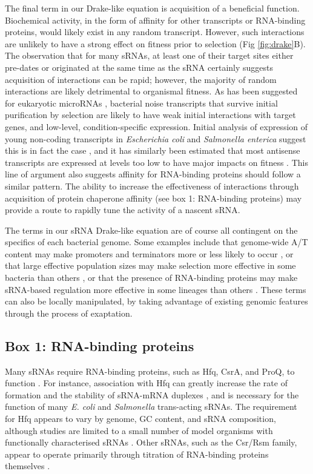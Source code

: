 The final term in our Drake-like equation is acquisition of a beneficial function. Biochemical activity, in the form of affinity for other transcripts or RNA-binding proteins, would likely exist in any random transcript. However, such interactions are unlikely to have a strong effect on fitness prior to selection (Fig \ref{fig:drake}B). The observation that for many sRNAs, at least one of their target sites either pre-dates or originated at the same time as the sRNA \citep{Peer2014-yn} certainly suggests acquisition of interactions can be rapid; however, the majority of random interactions are likely detrimental to organismal fitness. As has been suggested for eukaryotic microRNAs \citep{Chen2007-mn}, bacterial noise transcripts that survive initial purification by selection are likely to have weak initial interactions with target genes, and low-level, condition-specific expression. Initial analysis of expression of young non-coding transcripts in \textit{Escherichia coli} and \textit{Salmonella enterica} suggest this is in fact the case \citep{Kacharia2017-fv}, and it has similarly been estimated that most antisense transcripts are expressed at levels too low to have major impacts on fitness \citep{Llorens-Rico2016-hv}. This line of argument also suggests affinity for RNA-binding proteins should follow a similar pattern. The ability to increase the effectiveness of interactions through acquisition of protein chaperone affinity (see box 1: RNA-binding proteins) may provide a route to rapidly tune the activity of a nascent sRNA.\par 

The terms in our sRNA Drake-like equation are of course all contingent on the specifics of each bacterial genome. Some examples include that genome-wide A/T content may make promoters and terminators more or less likely to occur \citep{Llorens-Rico2016-hv}, or that large effective population sizes may make selection more effective in some bacteria than others \citep{Novichkov2009-yy}, or that the presence of RNA-binding proteins may make sRNA-based regulation more effective in some lineages than others \citep{Peer2014-yn}. These terms can also be locally manipulated, by taking advantage of existing genomic features through the process of exaptation.\par

\subsection{Box 1: RNA-binding proteins}
Many sRNAs require RNA-binding proteins, such as Hfq, CsrA, and ProQ, to function \citep{Holmqvist2010-lc}. For instance, association with Hfq can greatly increase the rate of formation and the stability of sRNA-mRNA duplexes \citep{Fender2010-co,Panja2015-he}, and is necessary for the function of many \textit{E. coli} and \textit{Salmonella} trans-acting sRNAs. The requirement for Hfq appears to vary by genome, GC content, and sRNA composition, although studies are limited to a small number of model organisms with functionally characterised sRNAs \citep{Jousselin2009-tv}. Other sRNAs, such as the Csr/Rsm family, appear to operate primarily through titration of RNA-binding proteins themselves \citep{Romeo2018-wb}.\par

